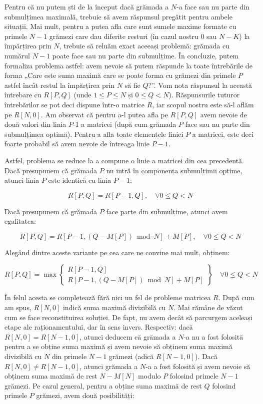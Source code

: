 Pentru că nu putem ști de la început dacă grămada a $N$-a face sau nu parte
din submulțimea maximală, trebuie să avem răspunsul pregătit pentru ambele
situații. Mai mult, pentru a putea afla care sunt sumele maxime formate cu
primele $N-1$ grămezi care dau diferite resturi (în cazul nostru 0 sau $N -
K$) la împărțirea prin $N$, trebuie să reluăm exact aceeași problemă: grămada
cu numărul $N-1$ poate face sau nu parte din submulțime. În concluzie, putem
formaliza problema astfel: avem nevoie să putem răspunde la toate întrebările
de forma „Care este suma maximă care se poate forma cu grămezi din primele $P$
astfel încât restul la împărțirea prin $N$ să fie $Q$?”. Vom nota răspunsul la
această întrebare cu $R[P,Q]$ (unde $1 \leq P \leq N$ și $0 \leq Q <
N$). Răspunsurile tuturor întrebărilor se pot deci dispune într-o matrice $R$,
iar scopul nostru este să-l aflăm pe $R[N,0]$. Am observat că pentru a-l putea
afla pe $R[P,Q]$ avem nevoie de două valori din linia $P$-1 a matricei (după
cum grămada $P$ face sau nu parte din submulțimea optimă). Pentru a afla toate
elementele liniei $P$ a matricei, este deci foarte probabil să avem nevoie de
întreaga linie $P-1$.

Astfel, problema se reduce la a compune o linie a matricei din cea
precedentă. Dacă presupunem că grămada $P$ nu intră în componența submulțimii
optime, atunci linia $P$ este identică cu linia $P-1$:

\begin{equation}
  R[P,Q] = R[P - 1, Q], \quad \forall 0 \leq Q < N
\end{equation}

Dacă presupunem că grămada $P$ face parte din submulțime, atunci avem
egalitatea:

\begin{equation}
  R[P,Q] = R[P - 1, (Q - M[P]) \bmod N] + M[P], \quad \forall 0 \leq Q < N
\end{equation}

Alegând dintre aceste variante pe cea care ne convine mai mult, obținem:

\begin{equation}
  R[P,Q] =  \max
  \begin{Bmatrix}
    R[P - 1, Q] \\
    R[P - 1, (Q - M[P]) \bmod N] + M[P]
  \end{Bmatrix}
  \quad \forall 0 \leq Q < N
\end{equation}

În felul acesta se completează fără nici un fel de probleme matricea $R$. După
cum am spus, $R[N,0]$ indică suma maximă divizibilă cu $N$. Mai rămâne de
văzut cum se face reconstituirea soluției. De fapt, nu avem decât să parcurgem
aceleași etape ale raționamentului, dar în sens invers. Respectiv: dacă
$R[N,0] = R[N-1,0]$, atunci deducem că grămada a $N$-a nu a fost folosită
pentru a se obține suma maximă și avem nevoie să obținem suma maximă
divizibilă cu $N$ din primele $N-1$ grămezi (adică $R[N-1,0]$). Dacă $R[N,0]
\neq R[N-1,0]$, atunci grămada a $N$-a a fost folosită și avem nevoie să
obținem suma maximă de rest $N-M[N]$ modulo $P$ folosind primele $N-1$
grămezi. Pe cazul general, pentru a obține suma maximă de rest $Q$ folosind
primele $P$ grămezi, avem două posibilități:

